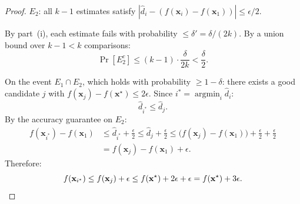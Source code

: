 \begin{proof}
$E_2$: all $k-1$ estimates satisfy $|\hat{d}_i - (f(\mathbf{x}_i) - f(\mathbf{x}_1))| \leq \epsilon/2$.

By part~(i), each estimate fails with probability $\leq \delta' = \delta/(2k)$. By a union bound over $k-1 < k$ comparisons:
\[
\Pr[E_2^c] \leq (k-1) \cdot \frac{\delta}{2k} < \frac{\delta}{2}.
\]

On the event $E_1 \cap E_2$, which holds with probability $\geq 1 - \delta$:
there exists a good candidate $j$ with $f(\mathbf{x}_j) - f(\mathbf{x}^\star) \leq 2\epsilon$. Since $i^* = \operatorname{argmin}_i \hat{d}_i$:
\[
\hat{d}_{i^*} \leq \hat{d}_j.
\]
By the accuracy guarantee on $E_2$:
\begin{align*}
f(\mathbf{x}_{i^*}) - f(\mathbf{x}_1) &\leq \hat{d}_{i^*} + \frac{\epsilon}{2} \leq \hat{d}_j + \frac{\epsilon}{2} \leq \bigl(f(\mathbf{x}_j) - f(\mathbf{x}_1)\bigr) + \frac{\epsilon}{2} + \frac{\epsilon}{2} \\
&= f(\mathbf{x}_j) - f(\mathbf{x}_1) + \epsilon.
\end{align*}
Therefore:
\[
f(\mathbf{x}_{i^*}) \leq f(\mathbf{x}_j) + \epsilon \leq f(\mathbf{x}^\star) + 2\epsilon + \epsilon = f(\mathbf{x}^\star) + 3\epsilon. \qedhere
\]
\end{proof}
